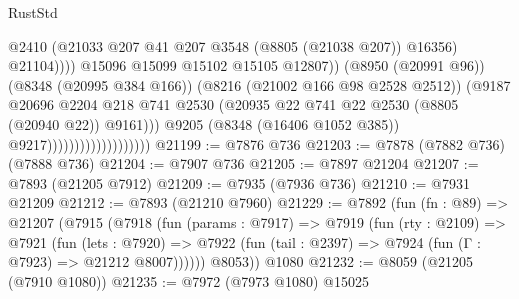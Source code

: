\begin{lexlean}{RustStd}
\begin{coremodule}
                                                        @2410
                                                        (@21033
                                                          @207
                                                          @41
                                                          @207
                                                          @3548
                                                          (@8805 (@21038 @207))
                                                          @16356)
                                                        @21104))))
                                                @15096
                                                @15099
                                                @15102
                                                @15105
                                                @12807))
                                            (@8950 (@20991 @96))
                                            (@8348 (@20995 @384 @166))
                                            (@8216 (@21002 @166 @98 @2528 @2512))
                                            (@9187
                                              @20696
                                              @2204
                                              @218
                                              @741
                                              @2530
                                              (@20935
                                                @22
                                                @741
                                                @22
                                                @2530
                                                (@8805 (@20940 @22))
                                                @9161)))
                                          @9205
                                          (@8348 (@16406 @1052 @385))
                                          @9217)))))))))))))))))))
@21199 := @7876 @736
@21203 := @7878 (@7882 @736) (@7888 @736)
@21204 := @7907 @736
@21205 := @7897 @21204
@21207 := @7893 (@21205 @7912)
@21209 := @7935 (@7936 @736)
@21210 := @7931 @21209
@21212 := @7893 (@21210 @7960)
@21229 := @7892
    (fun (fn : @89) =>
    @21207
      (@7915
        (@7918
          (fun (params : @7917) =>
          @7919
            (fun (rty : @2109) =>
            @7921
              (fun (lets : @7920) =>
              @7922 (fun (tail : @2397) => @7924 (fun (Γ : @7923) => @21212 @8007))))))
        @8053))
    @1080
@21232 := @8059 (@21205 (@7910 @1080))
@21235 := @7972 (@7973 @1080) @15025

\end{coremodule}
\end{lexlean}
